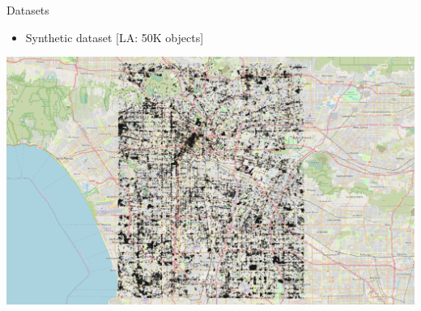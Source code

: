 \documentclass{beamer}
\begin{document}
     \begin{frame}{Datasets}
        \begin{itemize} \item Synthetic dataset [LA: 50K objects]\end{itemize} \vspace{0.25cm}

         \centering
         \includegraphics[width=\textwidth]{figures/LA_T320_N50K.png}
     \end{frame}
\end{document}
